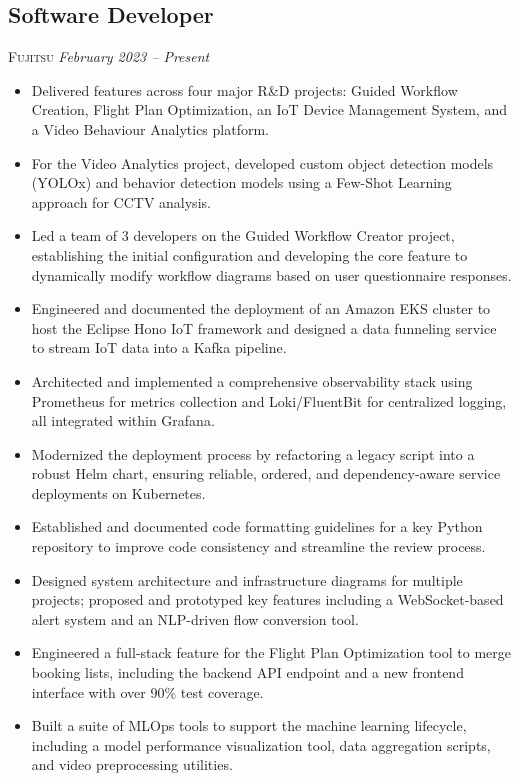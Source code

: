 \documentclass[10pt, a4paper]{article} %
\begin{document}
\subsection*{Software Developer}
\textsc{Fujitsu} \textit{February 2023 – Present}
\begin{itemize}
    \itemsep -0.5em %
    \item Delivered features across four major R\&D projects: Guided Workflow Creation, Flight Plan Optimization, an IoT Device Management System, and a Video Behaviour Analytics platform.
    \item For the Video Analytics project, developed custom object detection models (YOLOx) and behavior detection models using a Few-Shot Learning approach for CCTV analysis.
    \item Led a team of 3 developers on the Guided Workflow Creator project, establishing the initial configuration and developing the core feature to dynamically modify workflow diagrams based on user questionnaire responses.
    \item Engineered and documented the deployment of an Amazon EKS cluster to host the Eclipse Hono IoT framework and designed a data funneling service to stream IoT data into a Kafka pipeline.
    \item Architected and implemented a comprehensive observability stack using Prometheus for metrics collection and Loki/FluentBit for centralized logging, all integrated within Grafana.
    \item Modernized the deployment process by refactoring a legacy script into a robust Helm chart, ensuring reliable, ordered, and dependency-aware service deployments on Kubernetes.
    \item Established and documented code formatting guidelines for a key Python repository to improve code consistency and streamline the review process.
    \item Designed system architecture and infrastructure diagrams for multiple projects; proposed and prototyped key features including a WebSocket-based alert system and an NLP-driven flow conversion tool.
    \item Engineered a full-stack feature for the Flight Plan Optimization tool to merge booking lists, including the backend API endpoint and a new frontend interface with over 90\% test coverage.
    \item Built a suite of MLOps tools to support the machine learning lifecycle, including a model performance visualization tool, data aggregation scripts, and video preprocessing utilities.
\end{itemize}
\end{document}
